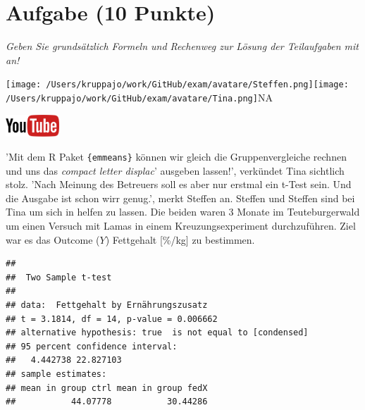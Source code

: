 \documentclass[a4paper, 9pt]{scrartcl}\usepackage[]{graphicx}\usepackage[]{xcolor}
\makeatletter
\newenvironment{kframe}{%
 \def\at@end@of@kframe{}%
 \ifinner\ifhmode%
  \def\at@end@of@kframe{\end{minipage}}%
  \begin{minipage}{\columnwidth}%
 \fi\fi%
 \def\FrameCommand##1{\hskip\@totalleftmargin \hskip-\fboxsep
 \colorbox{shadecolor}{##1}\hskip-\fboxsep
     \hskip-\linewidth \hskip-\@totalleftmargin \hskip\columnwidth}%
 \MakeFramed {\advance\hsize-\width
   \@totalleftmargin\z@ \linewidth\hsize
   \@setminipage}}%
 {\par\unskip\endMakeFramed%
 \at@end@of@kframe}
\newenvironment{knitrout}{}{} %
\makeatother
\begin{document}
 
\clearpage

\section{Aufgabe \hfill (10 Punkte)}

\textit{Geben Sie grundsätzlich Formeln und Rechenweg zur Lösung der Teilaufgaben mit an!} \\[1Ex]
 

 
\begin{minipage}[t]{0.5\textwidth}
\texttt{[image: /Users/kruppajo/work/GitHub/exam/avatare/Steffen.png]}\hspace{-4mm}\texttt{[image: /Users/kruppajo/work/GitHub/exam/avatare/Tina.png]}\hspace{-4mm}NA
\end{minipage}
\begin{minipage}[t]{0.5\textwidth}
\hfill
\href{https://youtu.be/exDo7AyHl4Q}{\includegraphics[width = 2cm]{img/youtube}}
\end{minipage}
\vspace{1ex}



'Mit dem R Paket \texttt{\{emmeans\}} können wir gleich die Gruppenvergleiche rechnen und uns das \textit{compact letter displac}' ausgeben lassen!', verkündet Tina sichtlich stolz. 'Nach Meinung des Betreuers soll es aber nur erstmal ein t-Test sein. Und die Ausgabe ist schon wirr genug.', merkt Steffen an. Steffen und Steffen sind bei Tina um sich in \Rlogo helfen zu lassen. Die beiden waren 3 Monate im Teuteburgerwald um einen Versuch mit Lamas in einem Kreuzungsexperiment durchzuführen. Ziel war es das Outcome ($Y$) Fettgehalt [\%/kg] zu bestimmen.

\begin{knitrout}
\color{fgcolor}\begin{kframe}
\begin{verbatim}
## 
## 	Two Sample t-test
## 
## data:  Fettgehalt by Ernährungszusatz
## t = 3.1814, df = 14, p-value = 0.006662
## alternative hypothesis: true  is not equal to [condensed]
## 95 percent confidence interval:
##   4.442738 22.827103
## sample estimates:
## mean in group ctrl mean in group fedX 
##           44.07778           30.44286
\end{verbatim}
\end{kframe}
\end{knitrout}
\end{document}
